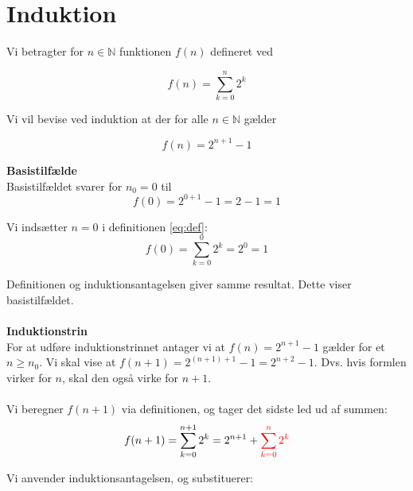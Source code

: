 \section{Induktion}

Vi betragter for $n \in \mathbb{N}$ funktionen $f(n)$ defineret ved 

\begin{equation}
\label{eq:def}
f(n) = \sum_{k=0}^{n} 2^k
\end{equation}

Vi vil bevise ved induktion at der for alle $n \in \mathbb{N}$ gælder 

\begin{equation}
    f(n) = 2^{n+1} -1
\end{equation}

\textbf{Basistilfælde}\\
Basistilfældet svarer for $n_0 = 0$ til
\begin{equation}
    f(0)= 2^{0+1} -1=2-1 = 1
\end{equation}


Vi indsætter $n=0$ i definitionen \ref{eq:def}:
\begin{equation}
f(0) = \sum_{k=0}^{0} 2^k = 2^0 = 1
\end{equation}

Definitionen og induktionsantagelsen giver samme resultat. Dette viser basistilfældet.\\
\\
\textbf{Induktionstrin}\\
For at udføre induktionstrinnet antager vi at $f(n) = 2^{n+1} -1$ gælder for et $n \geq n_0$. Vi skal vise at $f(n+1)=2^{(n+1)+1} -1 = 2^{n+2} -1$. Dvs. hvis formlen virker for $n$, skal den også virke for $n+1$.\\
\\
Vi beregner $f(n+1)$ via definitionen, og tager det sidste led ud af summen:
\begin{equation}
f(n+1)= \sum_{k=0}^{n+1} 2^k = 2^{n+1} + \textcolor{red}{\sum_{k=0}^{n} 2^k}
\end{equation}

Vi anvender induktionsantagelsen, og substituerer:

